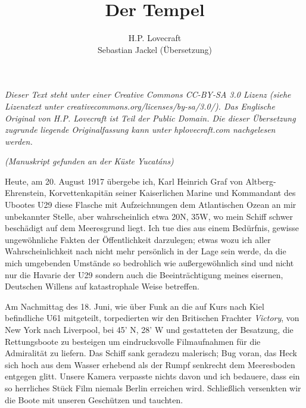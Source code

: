\documentclass[a4paper]{memoir}
\begin{document}
\title{Der Tempel}
\author{H.P. Lovecraft\\
		Sebastian Jackel (Übersetzung)}
\date{}
\maketitle
\textit{Dieser Text steht unter einer Creative Commons CC-BY-SA 3.0 Lizenz
(siehe Lizenztext unter creativecommons.org/licenses/by-sa/3.0/). Das Englische Original von H.P. Lovecraft ist Teil der Public Domain. Die dieser Übersetzung zugrunde liegende Originalfassung kann unter hplovecraft.com nachgelesen werden.}

\vspace{12pt}

\begin{center}
\textit{(Manuskript gefunden an der Küste Yucatáns)}
\end{center}

Heute, am 20. August 1917 übergebe ich, Karl Heinrich Graf von Altberg-\-Ehren\-stein, Korvettenkapitän seiner Kaiserlichen Marine und Kommandant des Ubootes U29 diese Flasche mit Aufzeichnungen dem Atlantischen Ozean an mir unbekannter Stelle, aber wahrscheinlich etwa 20\textdegree N, 35\textdegree W, wo mein Schiff schwer beschädigt auf dem Meeresgrund liegt. Ich tue dies aus einem Bedürfnis, gewisse ungewöhnliche Fakten der Öffentlichkeit darzulegen; etwas wozu ich aller Wahrscheinlichkeit nach nicht mehr persönlich in der Lage sein werde, da die mich umgebenden Umstände so bedrohlich wie außergewöhnlich sind und nicht nur die Havarie der U29 sondern auch die Beeinträchtigung meines eisernen, Deutschen Willens auf katastrophale Weise betreffen.

Am Nachmittag des 18. Juni, wie über Funk an die auf Kurs nach Kiel befindliche U61 mitgeteilt, torpedierten wir den Britischen Frachter \textit{Victory}, von New York nach Liverpool, bei 45' N, 28' W und gestatteten der Besatzung, die Rettungsboote zu besteigen um eindrucksvolle Filmaufnahmen für die Admiralität zu liefern. Das Schiff sank geradezu malerisch; Bug voran, das Heck sich hoch aus dem Wasser erhebend als der Rumpf senkrecht dem Meeresboden entgegen glitt. Unsere Kamera verpasste nichts davon und ich bedauere, dass ein so herrliches Stück Film niemals Berlin erreichen wird. Schließlich versenkten wir die Boote mit unseren Geschützen und tauchten.
\end{document}
